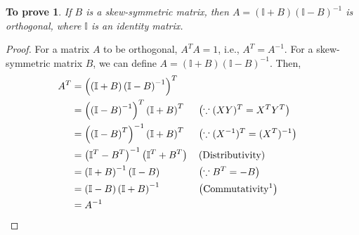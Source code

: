 \documentclass[11pt, oneside]{article}
\newtheorem*{remark}{To prove}
\begin{document}
\begin{remark}
If $B$ is a skew-symmetric matrix, then $A = (\mathbb{I}+B)(\mathbb{I}-B)^{-1}$ is orthogonal, where $\mathbb{I}$ is an identity matrix.
\end{remark}
\begin{proof}
  For a matrix $A$ to be orthogonal, $A^T A = 1$, i.e., $A^T = A^{-1}$. For a skew-symmetric matrix $B$, we can define $ A = (\mathbb{I}+B)(\mathbb{I}-B)^{-1}$. Then,
  \begin{align*}
    A^T   &= \left(\left(\mathbb{I}+B\right)\left(\mathbb{I}-B\right)^{-1}\right)^T \\
          &= \left(\left(\mathbb{I}-B\right)^{-1}\right)^T\left(\mathbb{I}+B\right)^T     && \left(\because (XY)^T = X^T Y^T\right)\\
          &= \left(\left(\mathbb{I}-B\right)^T\right)^{-1}\left(\mathbb{I}+B\right)^T     && \left(\because (X^{-1})^T = (X^T)^{-1}\right)\\
          &= \left(\mathbb{I}^T-B^T\right)^{-1}\left(\mathbb{I}^T+B^T\right)              && \left(\text{Distributivity}\right) \\
          &= \left(\mathbb{I} + B\right)^{-1}\left(\mathbb{I}-B\right)                    && \left(\because B^T = - B\right)\\
          &= \left(\mathbb{I}-B\right)\left(\mathbb{I}+B\right)^{-1}                      && \left(\text{Commutativity\footnotemark}\right)\\
          &= A^{-1}                                                 && \qedhere
  \end{align*}
\end{proof}
\end{document}
